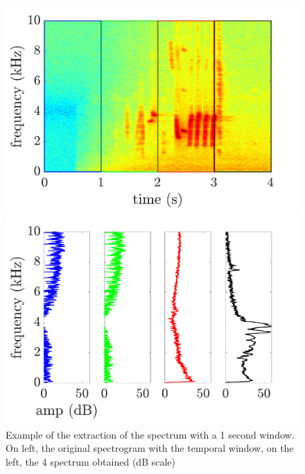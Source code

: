 \documentclass[twocolumn,a4paper,10pt]{article}
\begin{document}
\begin{figure}[!t]
\centering
	\begin{minipage}[t]{.24\textwidth}
		\centering
		\includegraphics[width=\linewidth]{../image/extractionDictionary1Example.pdf} 
	\end{minipage}
	\begin{minipage}[t]{.24\textwidth}
		\centering
		\includegraphics[width=\linewidth]{../image/extractionDictionary2Example.pdf} 
	\end{minipage}
	\caption{Example of the extraction of the spectrum with a 1 second window. On left, the original spectrogram with the temporal window, on the left, the 4 spectrum obtained (dB scale)}
	\label{fig:dictionaryExtraction}
\end{figure}
\end{document}
